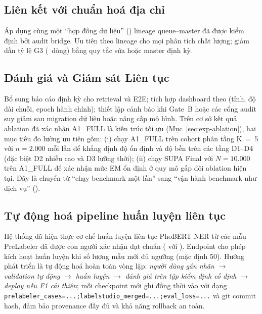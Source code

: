 \subsection{Liên kết với chuẩn hoá địa chỉ}
\label{sec:concl-h4}

Áp dụng cùng một ``hợp đồng dữ liệu'' () lineage queue--master đã được kiểm định bởi audit bridge. Ưu tiên  theo lineage cho mọi phân tích chất lượng; giảm dần tỷ lệ  G3 (\VNAIGENAuditGThreeFail\, dòng) bằng quy tắc sửa hoặc  master định kỳ.

\subsection{Đánh giá và Giám sát Liên tục}
\label{sec:concl-h5}

Bổ sung báo cáo định kỳ cho retrieval và E2E; tích hợp dashboard theo  (tỉnh, độ dài chuỗi, epoch hành chính); thiết lập cảnh báo khi Gate~B hoặc các cổng audit suy giảm sau migration dữ liệu hoặc nâng cấp mô hình. Trên cơ sở kết quả ablation đã xác nhận A1\_FULL là kiến trúc tối ưu (Mục~\ref{sec:exp-ablation}), hai mục tiêu đo lường ưu tiên gồm: (i) chạy A1\_FULL trên cohort phân tầng K~=~5 với \(n = 2.000\) mỗi lần để khẳng định độ ổn định và độ bền trên các tầng D1--D4 (đặc biệt D2 nhiễu cao và D3 lưỡng thời); (ii) chạy SUPA Final với \(N = 10.000\) trên A1\_FULL để xác nhận mức EM ổn định ở quy mô gấp đôi ablation hiện tại. Đây là chuyển từ ``chạy benchmark một lần'' sang ``vận hành benchmark như dịch vụ'' ().

\subsection{Tự động hoá pipeline huấn luyện liên tục}
\label{sec:concl-h5bis}

Hệ thống đã hiện thực cơ chế huấn luyện liên tục PhoBERT NER từ các mẫu PreLabeler đã được con người xác nhận đạt chuẩn ( với ). Endpoint  cho phép kích hoạt huấn luyện khi số lượng mẫu mới đủ ngưỡng (mặc định 50). Hướng phát triển là tự động hoá hoàn toàn vòng lặp: \emph{người dùng gán nhãn} \(\to\) \emph{validation tự động} \(\to\) \emph{huấn luyện} \(\to\) \emph{đánh giá trên tập kiểm định cố định} \(\to\) \emph{deploy nếu F1 cải thiện}; mỗi checkpoint mới ghi đồng thời vào  với  dạng \texttt{prelabeler\_cases=...;labelstudio\_merged=...;eval\_loss=...} và git commit hash, đảm bảo provenance đầy đủ và khả năng rollback an toàn.

